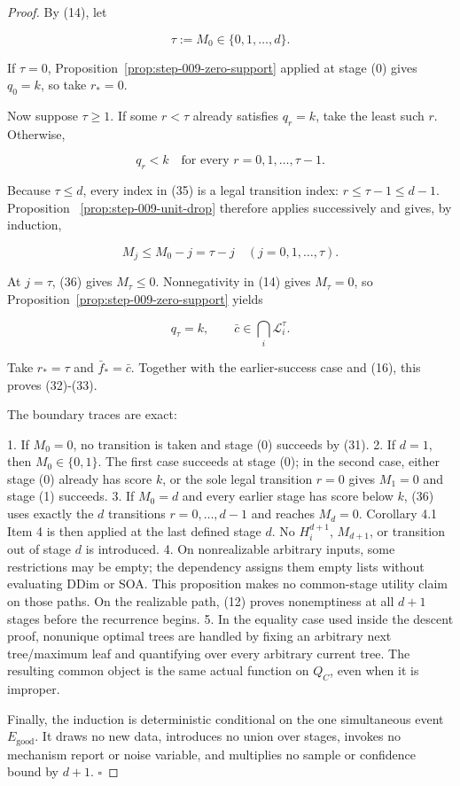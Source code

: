 \begin{proof}
By (14), let

\[
 \tau:=M_0\in\{0,1,\ldots,d\}.
 \tag{34}
\]

If \(\tau=0\), Proposition~\ref{prop:step-009-zero-support} applied at
stage (0) gives \(q_0=k\), so take \(r_*=0\).

Now suppose \(\tau\ge1\). If some \(r<\tau\) already satisfies \(q_r=k\),
take the least such \(r\). Otherwise,

\[
 q_r<k\quad\text{for every }r=0,1,\ldots,\tau-1.
 \tag{35}
\]

Because \(\tau\le d\), every index in (35) is a legal transition index:
\(r\le\tau-1\le d-1\). Proposition
~\ref{prop:step-009-unit-drop} therefore applies successively and gives,
by induction,

\[
 M_j\le M_0-j=\tau-j
 \quad(j=0,1,\ldots,\tau).
 \tag{36}
\]

At \(j=\tau\), (36) gives \(M_\tau\le0\). Nonnegativity in (14) gives
\(M_\tau=0\), so Proposition~\ref{prop:step-009-zero-support} yields

\[
 q_\tau=k,
 \qquad
 \bar c\in\bigcap_i\mathcal L_i^\tau.
 \tag{37}
\]

Take \(r_*=\tau\) and \(\bar f_*=\bar c\). Together with the earlier-success
case and (16), this proves (32)-(33).

The boundary traces are exact:

1. If \(M_0=0\), no transition is taken and stage (0) succeeds by (31).
2. If \(d=1\), then \(M_0\in\{0,1\}\). The first case succeeds at stage
   (0); in the second case, either stage (0) already has score \(k\),
   or the sole legal transition \(r=0\) gives \(M_1=0\) and stage (1)
   succeeds.
3. If \(M_0=d\) and every earlier stage has score below \(k\), (36) uses
   exactly the \(d\) transitions \(r=0,\ldots,d-1\) and reaches
   \(M_d=0\). Corollary 4.1 Item 4 is then applied at the last defined
   stage \(d\). No \(H_i^{d+1}\), \(M_{d+1}\), or transition out of stage
   \(d\) is introduced.
4. On nonrealizable arbitrary inputs, some restrictions may be empty; the
    dependency assigns them empty lists without evaluating DDim or
   SOA. This proposition makes no common-stage utility claim on those
   paths. On the realizable path, (12) proves nonemptiness at all \(d+1\)
   stages before the recurrence begins.
5. In the equality case used inside the descent proof, nonunique optimal
   trees are handled by fixing an arbitrary next tree/maximum leaf and
   quantifying over every arbitrary current tree. The resulting common
   object is the same actual function on \(Q_C\), even when it is
   improper.

Finally, the induction is deterministic conditional on the one
simultaneous event \(E_{\mathrm{good}}\). It draws no new data, introduces
no union over stages, invokes no mechanism report or noise variable, and
multiplies no sample or confidence bound by \(d+1\). \(\square\)


\end{proof}

